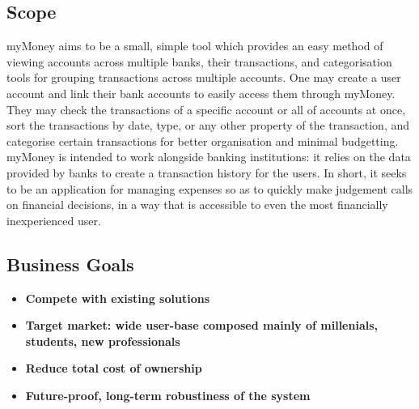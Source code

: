 \documentclass[11pt]{article}
\newcounter{use case ID}
\newcounter{req ID}
\begin{document}

\subsection{Scope}
myMoney aims to be a small, simple tool which provides an easy method of viewing accounts across multiple banks, their transactions, and categorisation tools for grouping transactions across multiple accounts. One may create a user account and link their bank accounts to easily access them through myMoney. They may check the transactions of a specific account or all of accounts at once, sort the transactions by date, type, or any other property of the transaction, and categorise certain transactions for better organisation and minimal budgetting. myMoney is intended to work alongside banking institutions: it relies on the data provided by banks to create a transaction history for the users. In short, it seeks to be an application for managing expenses so as to quickly make judgement calls on financial decisions, in a way that is accessible to even the most financially inexperienced user.

\subsection{Business Goals}

\begin{itemize}
    \item \textbf{Compete with existing solutions}
    \item \textbf{Target market: wide user-base composed mainly of millenials, students, new professionals}
    \item \textbf{Reduce total cost of ownership}
    \item \textbf{Future-proof, long-term robustiness of the system}
\end{itemize}
\end{document}
